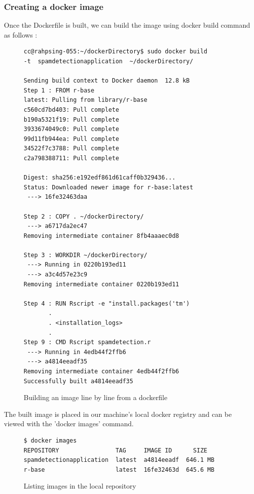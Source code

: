 \documentclass[9pt,twocolumn,twoside]{../../styles/osajnl}
\begin{document}
\subsubsection{Creating a docker image}

Once the Dockerfile is built, we can build the image using docker
build command as follows :

\begin{figure}[H]
\begin{verbatim}
cc@rahpsing-055:~/dockerDirectory$ sudo docker build 
-t  spamdetectionapplication  ~/dockerDirectory/

Sending build context to Docker daemon  12.8 kB
Step 1 : FROM r-base
latest: Pulling from library/r-base
c560cd7bd403: Pull complete 
b190a5321f19: Pull complete 
3933674049c0: Pull complete 
99d11fb944ea: Pull complete 
34522f7c3788: Pull complete 
c2a798388711: Pull complete 

Digest: sha256:e192edf861d61caff0b329436...
Status: Downloaded newer image for r-base:latest
 ---> 16fe32463daa

Step 2 : COPY . ~/dockerDirectory/
 ---> a6717da2ec47
Removing intermediate container 8fb4aaaec0d8

Step 3 : WORKDIR ~/dockerDirectory/
 ---> Running in 0220b193ed11
 ---> a3c4d57e23c9
Removing intermediate container 0220b193ed11

Step 4 : RUN Rscript -e "install.packages('tm')
       .
       . <installation_logs>
       .
Step 9 : CMD Rscript spamdetection.r
 ---> Running in 4edb44f2ffb6
 ---> a4814eeadf35
Removing intermediate container 4edb44f2ffb6
Successfully built a4814eeadf35
\end{verbatim}
\caption{Building an image line by line from a dockerfile}
\label{Building an image from a dockerfile}
\end{figure}


The built image is placed in our machine's local docker registry and
can be viewed with the 'docker images' command.

\begin{figure}[H]
\begin{verbatim}
$ docker images
REPOSITORY                TAG     IMAGE ID      SIZE
spamdetectionapplication  latest  a4814eeadf  646.1 MB
r-base                    latest  16fe32463d  645.6 MB
\end{verbatim}                   
\caption{Listing images in the local repository}
\label{Listing images in the local repository}
\end{figure}
\end{document}
